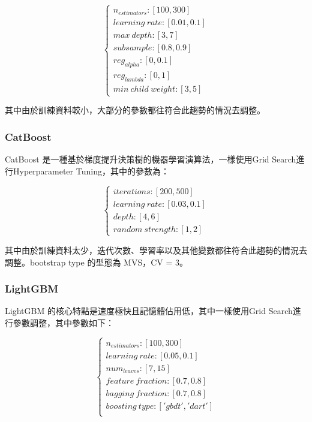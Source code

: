\documentclass[12pt]{ctexart}
\begin{document}
\[
\begin{cases}
    n_{estimators}: [100, 300] \\
    learning \ rate: [0.01, 0.1] \\
    max \ depth: [3, 7] \\
    subsample: [0.8, 0.9] \\
    reg_{alpha}: [0, 0.1] \\
    reg_{lambda}: [0, 1] \\
    min \ child \ weight: [3, 5]
\end{cases}
\]

其中由於訓練資料較小，大部分的參數都往符合此趨勢的情況去調整。

\subsubsection{CatBoost}

CatBoost 是一種基於梯度提升決策樹的機器學習演算法，一樣使用Grid Search進行Hyperparameter Tuning，其中的參數為：

\[
\begin{cases}
    iterations: [200, 500] \\
    learning \ rate: [0.03, 0.1] \\
    depth: [4, 6] \\
    random \ strength: [1, 2]
\end{cases}
\]

其中由於訓練資料太少，迭代次數、學習率以及其他變數都往符合此趨勢的情況去調整。bootstrap type 的型態為 MVS，CV = 3。

\subsubsection{LightGBM}

LightGBM 的核心特點是速度極快且記憶體佔用低，其中一樣使用Grid Search進行參數調整，其中參數如下：

\[
\begin{cases}
    n_{estimators}: [100, 300] \\
    learning \ rate: [0.05, 0.1] \\
    num_{leaves}: [7, 15] \\
    feature \ fraction: [0.7, 0.8] \\
    bagging \ fraction: [0.7, 0.8] \\
    boosting \ type: ['gbdt', 'dart'] \\    
\end{cases}
\]
\end{document}
